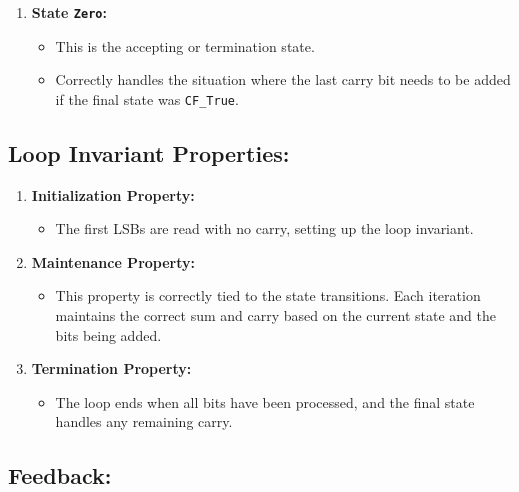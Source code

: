 \documentclass{article}
\begin{document}
\begin{enumerate}
    \item \textbf{State \texttt{Zero}:}
    \begin{itemize}
        \item This is the accepting or termination state.
        \item Correctly handles the situation where the last carry bit needs to be added if the final state was \texttt{CF\_True}.
    \end{itemize}
\end{enumerate}

\subsection*{Loop Invariant Properties:}

\begin{enumerate}
    \item \textbf{Initialization Property:} 
    \begin{itemize}
        \item The first LSBs are read with no carry, setting up the loop invariant.
    \end{itemize}
    
    \item \textbf{Maintenance Property:} 
    \begin{itemize}
        \item This property is correctly tied to the state transitions. Each iteration maintains the correct sum and carry based on the current state and the bits being added.
    \end{itemize}
    
    \item \textbf{Termination Property:} 
    \begin{itemize}
        \item The loop ends when all bits have been processed, and the final state handles any remaining carry.
    \end{itemize}
\end{enumerate}

\subsection*{Feedback:}
\end{document}
